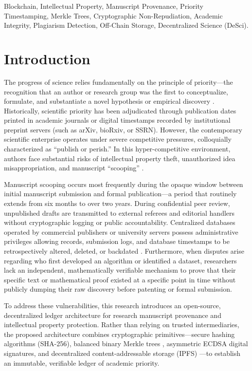 \documentclass[conference]{IEEEtran}
\begin{document}
\begin{IEEEkeywords}
Blockchain, Intellectual Property, Manuscript Provenance, Priority Timestamping, Merkle Trees, Cryptographic Non-Repudiation, Academic Integrity, Plagiarism Detection, Off-Chain Storage, Decentralized Science (DeSci).
\end{IEEEkeywords}

\section{Introduction}
The progress of science relies fundamentally on the principle of priority---the recognition that an author or research group was the first to conceptualize, formulate, and substantiate a novel hypothesis or empirical discovery \cite{haber1991timestamp, nakamoto2008bitcoin}. Historically, scientific priority has been adjudicated through publication dates printed in academic journals or digital timestamps recorded by institutional preprint servers (such as arXiv, bioRxiv, or SSRN). However, the contemporary scientific enterprise operates under severe competitive pressures, colloquially characterized as ``publish or perish.'' In this hyper-competitive environment, authors face substantial risks of intellectual property theft, unauthorized idea misappropriation, and manuscript ``scooping'' \cite{gipp2015decentralized, savelyev2018copyright}.

Manuscript scooping occurs most frequently during the opaque window between initial manuscript submission and formal publication---a period that routinely extends from six months to over two years. During confidential peer review, unpublished drafts are transmitted to external referees and editorial handlers without cryptographic logging or public accountability. Centralized databases operated by commercial publishers or university servers possess administrative privileges allowing records, submission logs, and database timestamps to be retrospectively altered, deleted, or backdated \cite{zheng2018survey, oleary2017openinformation}. Furthermore, when disputes arise regarding who first developed an algorithm or identified a dataset, researchers lack an independent, mathematically verifiable mechanism to prove that their specific text or mathematical proof existed at a specific point in time without publicly dumping their raw discovery before patenting or formal submission.

To address these vulnerabilities, this research introduces an open-source, decentralized ledger architecture for research manuscript provenance and intellectual property protection. Rather than relying on trusted intermediaries, the proposed architecture combines cryptographic primitives---secure hashing algorithms (SHA-256), balanced binary Merkle trees \cite{merkle1987signature}, asymmetric ECDSA digital signatures, and decentralized content-addressable storage (IPFS) \cite{benet2014ipfs}---to establish an immutable, verifiable ledger of academic priority.
\end{document}
